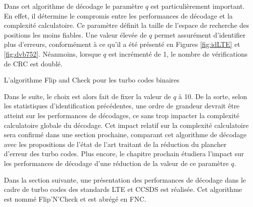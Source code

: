 Dans cet algorithme de décodage le paramètre $q$ est particulièrement important. En effet, il détermine le compromis entre les performances
de décodage et la complexité calculatoire. Ce paramètre définit la taille de l'espace de recherche des positions les moins
fiables. Une valeur élevée de $q$ permet assurément d'identifier plus d'erreurs, conformément à ce qu'il a été
présenté en Figures \ref{fig:idLTE} et \ref{fig:dvb752}. Néanmoins, lorsque $q$ est incrémenté de 1, le nombre de 
vérifications de CRC est doublé.
\begin{center}
\begin{minipage}{.86\textwidth}%
\begin{algorithm}[H]
\label{alg:fc_b}
	\DontPrintSemicolon
	
	\;
	\caption{L'algorithme Flip and Check pour les turbo codes binaires}
\end{algorithm}
\end{minipage}
\end{center}
Dans le suite, le choix est alors fait de fixer la valeur de $q$ à 10. De la sorte, selon les statistiques d'identification 
précédentes, une ordre de grandeur devrait être atteint sur les performances de décodages, ce sans trop impacter la complexité
calculatoire globale du décodage. Cet impact relatif sur la complexité calculatoire sera confirmé dans une section prochaine,
comparant cet algorithme de décodage avec les propositions de l'état de l'art traitant de la réduction du plancher d'erreur des turbo codes.
Plus encore, le chapitre prochain étudiera l'impact sur les performances de décodage d'une réduction de la valeur de ce paramètre $q$.

Dans la section suivante, une présentation des performances de décodage dans le cadre de turbo codes des standards LTE
et CCSDS est réalisée. Cet algorithme est nommé Flip'N'Check et est abrégé en FNC.


